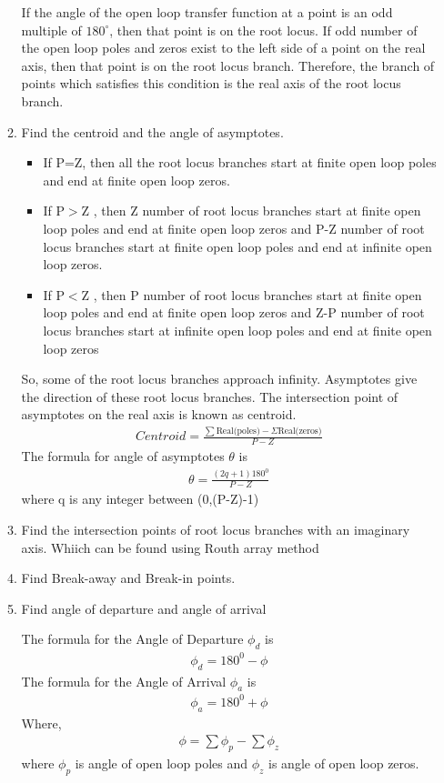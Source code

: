 \begin{enumerate}[label=\thesection.\arabic*.,ref=\thesection.\theenumi]
\begin{enumerate}
 If the angle of the open loop transfer function at a point is an odd multiple of $180^{\circ}$, then that point is on the root locus. If odd number of the open loop poles and zeros exist to the left side of a point on the real axis, then that point is on the root locus branch. Therefore, the branch of points which satisfies this condition is the real axis of the root locus branch.
	\item Find the centroid and the angle of asymptotes.
	\begin{itemize}
	\item If P=Z, then all the root locus branches start at finite open loop poles and end at finite open loop zeros.
	\item If P$>$Z , then Z number of root locus branches start at finite open loop poles and end at finite open loop zeros and P-Z number of root locus branches start at finite open loop poles and end at infinite open loop zeros.
	\item If P$<$Z , then P number of root locus branches start at finite open loop poles and end at finite open loop zeros and Z-P number of root locus branches start at infinite open loop poles and end at finite open loop zeros

	\end{itemize}
So, some of the root locus branches approach infinity. Asymptotes give the direction of these root locus branches. The intersection point of asymptotes on the real axis is known as centroid.
\begin{align}
Centroid =\frac{\sum \text {Real(poles)}-\Sigma \text {Real(zeros)}}{P-Z}
\end{align}
The formula for angle of asymptotes $\theta$ is
\begin{align}
\theta=\frac{(2 q+1) 180^{0}}{P-Z}
\end{align}
where q is any integer between (0,(P-Z)-1)


	\item Find the intersection points of root locus branches with an imaginary axis. Whiich can be found using Routh array method
	\item Find Break-away and Break-in points.
	\item Find angle of departure and angle of arrival

The formula for the Angle of Departure $\phi_{d}$ is
\begin{align}
\phi_{d}=180^{0}-\phi
\end{align}
The formula for the Angle of Arrival $\phi_{a}$ is
\begin{align}
\phi_{a}=180^{0}+\phi
\end{align}
Where,
\begin{align}
\phi=\sum \phi_{p}-\sum \phi_{z}
\end{align}
where $\phi_{p}$ is angle of open loop poles and $\phi_{z}$ is angle of open loop zeros.


\end{enumerate}
\end{enumerate}
